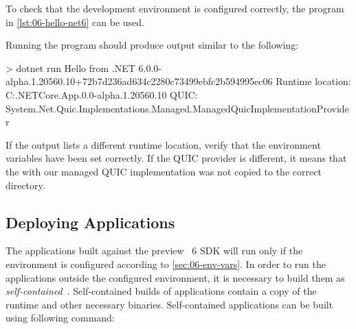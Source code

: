 To check that the development environment is configured correctly, the program in
\autoref{lst:06-hello-net6} can be used.


Running the program should produce output similar to the following:

\noindent\begin{minipage}{\textwidth}
\begin{myVerbatim}
> dotnet run
Hello from .NET 6.0.0-alpha.1.20560.10+72b7d236ad634c2280c73499ebfc2b594995ec06
Runtime location: C:\dotnet\shared\Microsoft.NETCore.App\6.0.0-alpha.1.20560.10
QUIC: System.Net.Quic.Implementations.Managed.ManagedQuicImplementationProvider
\end{myVerbatim}
\end{minipage}\medskip

If the output lists a different runtime location, verify that the environment variables have been
set correctly. If the QUIC provider is different, it means that the \SystemNetQuicDll{} with our
managed QUIC implementation was not copied to the correct directory.

\subsection{Deploying \dotnet{} Applications}

The applications built against the preview \dotnet{}~6 SDK will run only if the environment is
configured according to \autoref{sec:06-env-vars}. In order to run the applications outside the
configured environment, it is necessary to build them as
\textit{self-contained}~\cite{SelfContainedPublishDocs}. Self-contained builds of \dotnet{}
applications contain a copy of the \dotnet{} runtime and other necessary binaries. Self-contained
applications can be built using following command:

